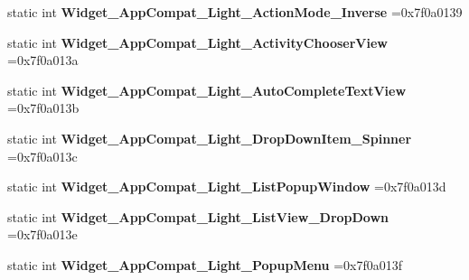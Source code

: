 \begin{DoxyCompactItemize}
\mbox{\label{classandroid_1_1support_1_1design_1_1R_1_1style_a4f8c4380f7816a8e9f2266c36b1a0135}} 
static int {\bfseries Widget\+\_\+\+App\+Compat\+\_\+\+Light\+\_\+\+Action\+Mode\+\_\+\+Inverse} =0x7f0a0139
\item 
\mbox{\label{classandroid_1_1support_1_1design_1_1R_1_1style_a8f97a03708fae7187688fae19797e3e0}} 
static int {\bfseries Widget\+\_\+\+App\+Compat\+\_\+\+Light\+\_\+\+Activity\+Chooser\+View} =0x7f0a013a
\item 
\mbox{\label{classandroid_1_1support_1_1design_1_1R_1_1style_a4759285e2563ad5673ba880de4198d04}} 
static int {\bfseries Widget\+\_\+\+App\+Compat\+\_\+\+Light\+\_\+\+Auto\+Complete\+Text\+View} =0x7f0a013b
\item 
\mbox{\label{classandroid_1_1support_1_1design_1_1R_1_1style_ae39b0ba2636ac3a2882bfdbf3f075895}} 
static int {\bfseries Widget\+\_\+\+App\+Compat\+\_\+\+Light\+\_\+\+Drop\+Down\+Item\+\_\+\+Spinner} =0x7f0a013c
\item 
\mbox{\label{classandroid_1_1support_1_1design_1_1R_1_1style_af2e73f05bc7698b4633c4cf9a9728932}} 
static int {\bfseries Widget\+\_\+\+App\+Compat\+\_\+\+Light\+\_\+\+List\+Popup\+Window} =0x7f0a013d
\item 
\mbox{\label{classandroid_1_1support_1_1design_1_1R_1_1style_aff95f8be916259cdbd634fa6ab616954}} 
static int {\bfseries Widget\+\_\+\+App\+Compat\+\_\+\+Light\+\_\+\+List\+View\+\_\+\+Drop\+Down} =0x7f0a013e
\item 
\mbox{\label{classandroid_1_1support_1_1design_1_1R_1_1style_a45781806358549e4f390cb3ca4117bb6}} 
static int {\bfseries Widget\+\_\+\+App\+Compat\+\_\+\+Light\+\_\+\+Popup\+Menu} =0x7f0a013f
\item 
\mbox{\label{classandroid_1_1support_1_1design_1_1R_1_1style_ad77bbb3639e99379f59e8547175ffd99}} 

\end{DoxyCompactItemize}
